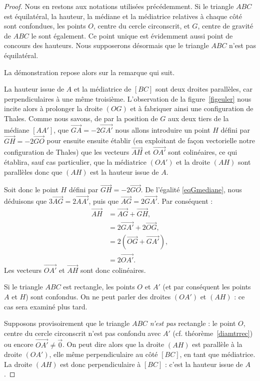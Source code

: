 \begin{proof}
Nous en restons aux notations utilisées précédemment.
Si le triangle $ABC$ est équilatéral, la hauteur,  la médiane et la médiatrice relatives à chaque côté sont confondues, les points $O$, centre du cercle circonscrit, et $G$, centre de gravité de $ABC$ le sont également. Ce point unique est évidemment aussi point de concours des hauteurs. Nous supposerons désormais que le triangle $ABC$ n'est pas équilatéral. 

La démonstration repose alors sur la remarque qui suit.
\begin{remark}
La hauteur issue de $A$ et la médiatrice de $[BC]$ sont deux droites parallèles, car perpendiculaires à une même troisième.
L'observation de la figure \ref{figeuler} nous incite alors à prolonger la droite $(OG)$ et à fabriquer ainsi une configuration de Thales. Comme nous savons, de par la position de $G$ aux deux tiers de la médiane $[AA']$, que $\overrightarrow{GA}=-2\overrightarrow{GA'}$ nous allons introduire un point $H$ défini  par $\overrightarrow{GH}=-2\overrightarrow{GO}$ pour ensuite ensuite établir (en exploitant de façon vectorielle notre configuration de Thales) que les vecteurs $ \overrightarrow{AH}$ et  $\overrightarrow{OA'}$ sont colinéaires, ce qui établira, sauf cas particulier, que la médiatrice $(OA')$ et la droite $(AH)$ sont parallèles donc que $(AH)$ est la hauteur issue de $A$.
\end{remark}

Soit donc le point $H$ défini par $\overrightarrow{GH}=-2\overrightarrow{GO}$.
De l'égalité \eqref{eqGmediane}, nous déduisons que $3\overrightarrow{AG}=2\overrightarrow{AA'}$, puis que $\overrightarrow{AG}=2\overrightarrow{GA'}$. Par conséquent :
\[\begin{split} \overrightarrow{AH}&=\overrightarrow{AG}+\overrightarrow{GH},\\
&=2\overrightarrow{GA'}+2\overrightarrow{OG},\\
&=2(\overrightarrow{OG}+\overrightarrow{GA'}),\\
&=2\overrightarrow{OA'}.
\end{split}
\]
Les vecteurs $\overrightarrow{OA'}$ et $\overrightarrow{AH}$ sont donc colinéaires. 

\begin{alert}
Si le triangle $ABC$ est rectangle, les points $O$ et $A'$ (et par conséquent les points $A$ et $H$) sont confondus. On ne peut parler des droites $(OA')$ et $(AH)$ : ce cas sera examiné plus tard.
\end{alert}
Supposons provisoirement que le triangle $ABC$ \emph{n'est pas} rectangle : le point $O$, centre du cercle circonscrit n'est pas confondu avec $A'$ (cf. théorème \ref{diamtrrec}) ou encore $\overrightarrow{OA'}\neq\vec{0}$. On peut dire alors que la droite $(AH)$ est parallèle à la droite $(OA')$, elle même perpendiculaire au côté $[BC]$, en tant que médiatrice. La droite $(AH)$ est donc perpendiculaire à $[BC]$ : c'est la hauteur issue de $A$.



\end{proof}

